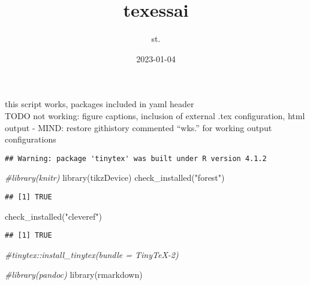\documentclass[
]{article}
\title{texessai}
\author{st.}
\date{2023-01-04}
\newenvironment{Shaded}{\begin{snugshade}}{\end{snugshade}}
\newcommand{\AttributeTok}[1]{\textcolor[rgb]{0.77,0.63,0.00}{#1}}
\newcommand{\CommentTok}[1]{\textcolor[rgb]{0.56,0.35,0.01}{\textit{#1}}}
\newcommand{\ConstantTok}[1]{\textcolor[rgb]{0.00,0.00,0.00}{#1}}
\newcommand{\FunctionTok}[1]{\textcolor[rgb]{0.00,0.00,0.00}{#1}}
\newcommand{\NormalTok}[1]{#1}
\newcommand{\SpecialCharTok}[1]{\textcolor[rgb]{0.00,0.00,0.00}{#1}}
\newcommand{\StringTok}[1]{\textcolor[rgb]{0.31,0.60,0.02}{#1}}
\begin{document}
\maketitle

this script works, packages included in yaml header\\
TODO not working: figure captions, inclusion of external .tex
configuration, html output - MIND: restore githistory commented ``wks.''
for working output configurations

\begin{Shaded}
\end{Shaded}

\begin{verbatim}
## Warning: package 'tinytex' was built under R version 4.1.2
\end{verbatim}

\begin{Shaded}
\begin{Highlighting}[]
\CommentTok{\#library(knitr)}
\FunctionTok{library}\NormalTok{(tikzDevice)}
\FunctionTok{check\_installed}\NormalTok{(}\StringTok{"forest"}\NormalTok{)}
\end{Highlighting}
\end{Shaded}

\begin{verbatim}
## [1] TRUE
\end{verbatim}

\begin{Shaded}
\begin{Highlighting}[]
\FunctionTok{check\_installed}\NormalTok{(}\StringTok{"cleveref"}\NormalTok{)}
\end{Highlighting}
\end{Shaded}

\begin{verbatim}
## [1] TRUE
\end{verbatim}

\begin{Shaded}
\begin{Highlighting}[]
\CommentTok{\#tinytex::install\_tinytex(bundle = \textquotesingle{}TinyTeX{-}2\textquotesingle{})}

\CommentTok{\#library(pandoc)}
\FunctionTok{library}\NormalTok{(rmarkdown)}
\end{Highlighting}
\end{Shaded}
\end{document}
